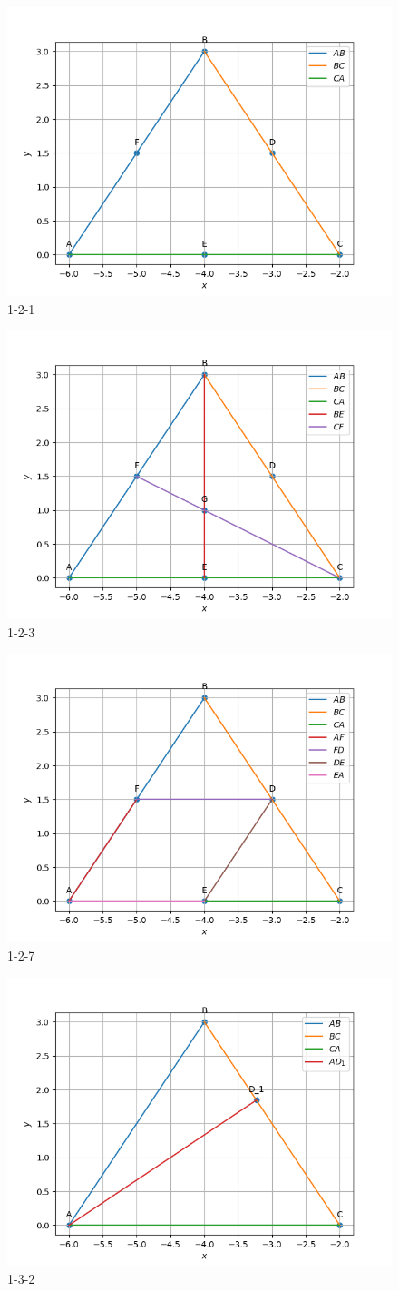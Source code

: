 \documentclass[journal,12pt,onecolumn]{IEEEtran}
\theoremstyle{remark}
\begin{document}
\begin{figure}[!ht]
	\centering
	\includegraphics[width=0.5\columnwidth]{figs/1-2-1.png}
	\caption{1-2-1}
	\label{fig33:Triangle_with_centroid}	
\end{figure}
\begin{figure}[!ht]
	\centering
	\includegraphics[width=0.5\columnwidth]{figs/1-2-3.png}
	\caption{1-2-3}
	\label{fig33:Triangle_with_centroid}	
\end{figure}
\begin{figure}[!ht]
	\centering
	\includegraphics[width=0.5\columnwidth]{figs/1-2-7.png}
	\caption{1-2-7}
	\label{fig33:Triangle_with_centroid}	
\end{figure}
\begin{figure}[!ht]
	\centering
	\includegraphics[width=0.5\columnwidth]{figs/1-3-2.png}
	\caption{1-3-2}
	\label{fig33:Triangle_with_centroid}	
\end{figure}
\end{document}
